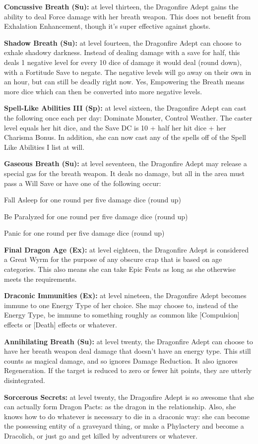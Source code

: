 \textbf{Concussive Breath (Su):} at level thirteen, the Dragonfire Adept gains the ability to deal Force damage with her breath weapon. This does not benefit from Exhalation Enhancement, though it's super effective against ghosts.

\textbf{Shadow Breath (Su):} at level fourteen, the Dragonfire Adept can choose to exhale shadowy darkness. Instead of dealing damage with a save for half, this deals 1 negative level for every 10 dice of damage it would deal (round down), with a Fortitude Save to negate. The negative levels will go away on their own in an hour, but can still be deadly right now. Yes, Empowering the Breath means more dice which can then be converted into more negative levels.

\textbf{Spell-Like Abilities III (Sp):} at level sixteen, the Dragonfire Adept can cast the following once each per day: Dominate Monster, Control Weather. The caster level equals her hit dice, and the Save DC is 10 + half her hit dice + her Charisma Bonus. In addition, she can now cast any of the spells off of the Spell Like Abilities I list at will.

\textbf{Gaseous Breath (Su):} at level seventeen, the Dragonfire Adept may release a special gas for the breath weapon. It deals no damage, but all in the area must pass a Will Save or have one of the following occur:

\begin{itemize*}
\item Fall Asleep for one round per five damage dice (round up)
\item Be Paralyzed for one round per five damage dice (round up)
\item Panic for one round per five damage dice (round up)
\end{itemize*}

\textbf{Final Dragon Age (Ex):} at level eighteen, the Dragonfire Adept is considered a Great Wyrm for the purpose of any obscure crap that is based on age categories. This also means she can take Epic Feats as long as she otherwise meets the requirements.

\textbf{Draconic Immunities (Ex):} at level nineteen, the Dragonfire Adept becomes immune to one Energy Type of her choice. She may choose to, instead of the Energy Type, be immune to something roughly as common like [Compulsion] effects or [Death] effects or whatever.

\textbf{Annihilating Breath (Su):} at level twenty, the Dragonfire Adept can choose to have her breath weapon deal damage that doesn't have an energy type. This still counts as magical damage, and so ignores Damage Reduction. It also ignores Regeneration. If the target is reduced to zero or fewer hit points, they are utterly disintegrated.

\textbf{Sorcerous Secrets:} at level twenty, the Dragonfire Adept is so awesome that she can actually form Dragon Pacts: as the dragon in the relationship. Also, she knows how to do whatever is necessary to die in a draconic way: she can become the possessing entity of a graveyard thing, or make a Phylactery and become a Dracolich, or just go and get killed by adventurers or whatever.